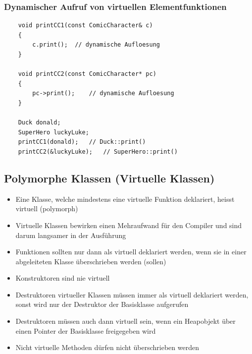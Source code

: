 \subsubsection{Dynamischer Aufruf von virtuellen Elementfunktionen}
\noindent
\begin{minipage}{\linewidth}
	\begin{lstlisting}
	void printCC1(const ComicCharacter& c)
	{
		c.print();	// dynamische Aufloesung
	}
	
	void printCC2(const ComicCharacter* pc)
	{
		pc->print();	// dynamische Aufloesung
	}
	
	Duck donald;
	SuperHero luckyLuke;
	printCC1(donald);	// Duck::print()
	printCC2(&luckyLuke);	// SuperHero::print()
	\end{lstlisting}
\end{minipage}

\subsection{Polymorphe Klassen (Virtuelle Klassen)}
\begin{itemize}
	\item Eine Klasse, welche mindestens eine virtuelle Funktion deklariert, heisst virtuell (polymorph)
	\item Virtuelle Klassen bewirken einen Mehraufwand für den Compiler und sind darum langsamer in der Ausführung
	\item Funktionen sollten nur dann als virtuell deklariert werden, wenn sie in einer abgeleiteten Klasse überschrieben werden (sollen)
	\item Konstruktoren sind nie virtuell
	\item Destruktoren virtueller Klassen müssen immer als virtuell deklariert werden, sonst wird nur der Destruktor der Basisklasse aufgerufen
	\item Destruktoren müssen auch dann virtuell sein, wenn ein Heapobjekt über einen Pointer der Basisklasse freigegeben wird
	\item Nicht virtuelle Methoden dürfen nicht überschrieben werden	
\end{itemize}

